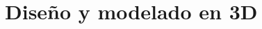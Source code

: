 \documentclass{subfiles}
\begin{document}
  \chapter{Diseño y modelado en 3D}
  \label{chap:4}
\end{document}
